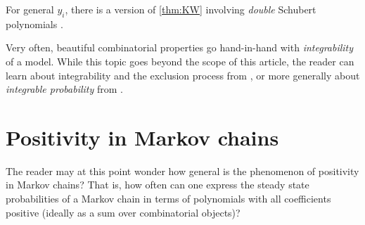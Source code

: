 \documentclass[11pt]{amsart}
\theoremstyle{definition}
\theoremstyle{remark}
\begin{document}
For general $y_i$, there is a version of \cref{thm:KW}
involving \emph{double} Schubert polynomials \cite{KW}.








Very often, beautiful combinatorial properties 
go hand-in-hand with \emph{integrability} of a model.
  While this topic goes beyond the scope of 
this article, the reader can learn about 
integrability and the exclusion process from \cite{Cantini2, Crampe},
or more generally
 about \emph{integrable probability} from \cite{Borodin}.

\newpage
\section{Positivity in Markov chains}

The reader may at this point wonder how general is the phenomenon of positivity in 
Markov chains?
That is, how often can one express the steady state probabilities of a Markov chain 
in terms of polynomials with all coefficients positive
(ideally as a sum over combinatorial objects)?
\end{document}
